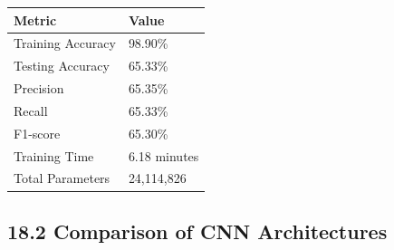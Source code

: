 \documentclass[11pt]{article}
\begin{document}
\begin{center}

\begin{tabular}{|p{5cm}|p{4cm}|}

\hline

Metric & Value\\

\hline

Training Accuracy & 98.90\%\\

\hline

Testing Accuracy & 65.33\%\\

\hline

Precision & 65.35\%\\

\hline

Recall & 65.33\%\\

\hline

F1-score & 65.30\%\\

\hline

Training Time & 6.18 minutes\\

\hline

Total Parameters & 24,114,826\\

\hline

\end{tabular}

\end{center}

\vspace{5mm}

\subsection*{18.2 Comparison of CNN Architectures}
\end{document}
